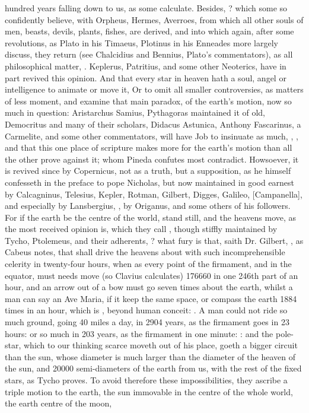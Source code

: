 {hundred years falling down to us, as some calculate. Besides, ? which some so confidently believe, with Orpheus, Hermes, Averroes, from which all other souls of men, beasts, devils, plants, fishes, \etc{} are derived, and into which again, after some revolutions, as Plato in his Timaeus, Plotinus in his Enneades more largely discuss, they return (see Chalcidius and Bennius, Plato's commentators), as all philosophical matter, . Keplerus, Patritius, and some other Neoterics, have in part revived this opinion. And that every star in heaven hath a soul, angel or intelligence to animate or move it, \etc{} Or to omit all smaller controversies, as matters of less moment, and examine that main paradox, of the earth's motion, now so much in question: Aristarchus Samius, Pythagoras maintained it of old, Democritus and many of their scholars, Didacus Astunica, Anthony Fascarinus, a Carmelite, and some other commentators, will have Job to insinuate as much,  , \etc{}, and that this one place of scripture makes more for the earth's motion than all the other prove against it; whom Pineda confutes most contradict. Howsoever, it is revived since by Copernicus, not as a truth, but a supposition, as he himself confesseth in the preface to pope Nicholas, but now maintained in good earnest by Calcagninus, Telesius, Kepler, Rotman, Gilbert, Digges, Galileo, [Campanella], and especially by Lansbergius, , by Origanus, and some others of his followers. For if the earth be the centre of the world, stand still, and the heavens move, as the most received opinion is, which they call , though stiffly maintained by Tycho, Ptolemeus, and their adherents, ? \etc{} what fury is that, saith Dr. Gilbert, , as Cabeus notes, that shall drive the heavens about with such incomprehensible celerity in twenty-four hours, when as every point of the firmament, and in the equator, must needs move (so Clavius calculates) 176\thinspace{}660 in one 246th part of an hour, and an arrow out of a bow must go seven times about the earth, whilst a man can say an Ave Maria, if it keep the same space, or compass the earth 1884 times in an hour, which is , beyond human conceit: . A man could not ride so much ground, going 40 miles a day, in 2904 years, as the firmament goes in 23 hours: or so much in 203 years, as the firmament in one minute: : and the pole-star, which to our thinking scarce moveth out of his place, goeth a bigger circuit than the sun, whose diameter is much larger than the diameter of the heaven of the sun, and 20\thinspace{}000 semi-diameters of the earth from us, with the rest of the fixed stars, as Tycho proves. To avoid therefore these impossibilities, they ascribe a triple motion to the earth, the sun immovable in the centre of the whole world, the earth centre of the moon, }
